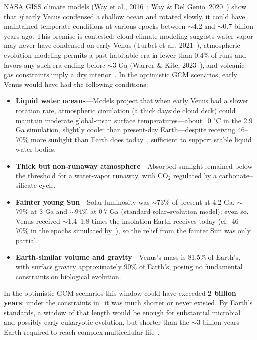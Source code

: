 \documentclass[aps,prd,twocolumn,superscriptaddress,nofootinbib]{revtex4-2}
\begin{document}
NASA GISS climate models (Way et al., 2016~\cite{Way2016}; Way \& Del Genio, 2020~\cite{Way2020}) show that \textit{if} early Venus condensed a shallow ocean and rotated slowly, it could have maintained temperate conditions at various epochs between ${\sim}$4.2 and ${\sim}$0.7 billion years ago. This premise is contested: cloud-climate modeling suggests water vapor may never have condensed on early Venus (Turbet et al., 2021~\cite{Turbet2021}), atmospheric-evolution modeling permits a past habitable era in fewer than 0.4\% of runs and favors any such era ending before ${\sim}$3 Ga (Warren \& Kite, 2023~\cite{Warren2023}), and volcanic-gas constraints imply a dry interior~\cite{Constantinou2024}. In the optimistic GCM scenarios, early Venus would have had the following conditions:

\begin{itemize}
  \item \textbf{Liquid water oceans}---Models project that when early Venus had a slower rotation rate, atmospheric circulation (a thick dayside cloud deck) could maintain moderate global-mean surface temperatures---about 10 $^{\circ}$C in the 2.9 Ga simulation, slightly cooler than present-day Earth---despite receiving 46--70\% more sunlight than Earth does today~\cite{Way2016}, sufficient to support stable liquid water bodies.
  \item \textbf{Thick but non-runaway atmosphere}---Absorbed sunlight remained below the threshold for a water-vapor runaway, with CO$_{2}$ regulated by a carbonate--silicate cycle.
  \item \textbf{Fainter young Sun}---Solar luminosity was ${\sim}$73\% of present at 4.2 Ga, ${\sim}$79\% at 3 Ga and ${\sim}$94\% at 0.7 Ga (standard solar-evolution model); even so, Venus received ${\sim}$1.4--1.8 times the insolation Earth receives today (cf.\ 46--70\% in the epochs simulated by~\cite{Way2016}), so the relief from the fainter Sun was only partial.
  \item \textbf{Earth-similar volume and gravity}---Venus's mass is 81.5\% of Earth's, with surface gravity approximately 90\% of Earth's, posing no fundamental constraints on biological evolution.
\end{itemize}

In the optimistic GCM scenarios this window could have exceeded \textbf{2 billion years}; under the constraints in~\cite{Constantinou2024,Turbet2021,Warren2023} it was much shorter or never existed. By Earth's standards, a window of that length would be enough for substantial microbial and possibly early eukaryotic evolution, but shorter than the ${\sim}$3 billion years Earth required to reach complex multicellular life~\cite{Knoll2011}.
\end{document}
